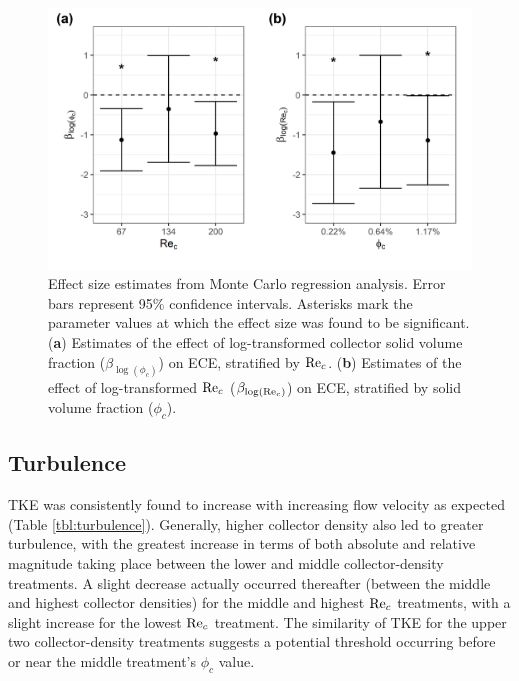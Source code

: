 \documentclass[geosciences,article,submit,moreauthors,pdftex]{Definitions/mdpi}
\begin{document}
\begin{figure}[H]
\centering
\includegraphics[width=5in]{../pics/montecarlo.png}
\caption{Effect size estimates from Monte Carlo regression analysis. Error bars represent 95\% confidence intervals. Asterisks mark the parameter values at which the effect size was found to be significant. (\textbf{a}) Estimates of the effect of log-transformed collector solid volume fraction ($\beta_{\log(\phi_c)}$) on ECE, stratified by $\mathrm{Re}_c$. (\textbf{b}) Estimates of the effect of log-transformed $\mathrm{Re}_c$ ($\beta_{\log(\mathrm{Re}_c)}$) on ECE, stratified by solid volume fraction ($\phi_c$).}
\label{fig:monte}
\end{figure}   

\subsection{Turbulence}

TKE was consistently found to increase with increasing flow velocity as expected (Table \ref{tbl:turbulence}). Generally, higher collector density also led to greater turbulence, with the greatest increase in terms of both absolute and relative magnitude taking place between the lower and middle collector-density treatments. A slight decrease actually occurred thereafter (between the middle and highest collector densities) for the middle and highest $\mathrm{Re}_c$ treatments, with a slight increase for the lowest $\mathrm{Re}_c$ treatment. The similarity of TKE for the upper two collector-density treatments suggests a potential threshold occurring before or near the middle treatment's $\phi_c$ value.
\end{document}
